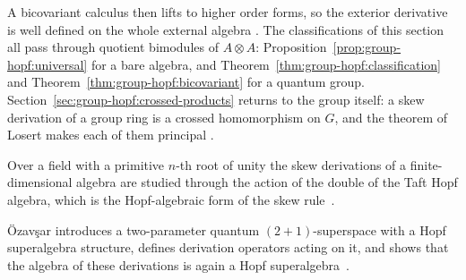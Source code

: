 A bicovariant calculus then lifts to higher order forms, so the exterior derivative
is well defined on the whole external algebra \cite[p.~125]{Woronowicz1989}. The
classifications of this section all pass through quotient bimodules of $A\otimes A$:
Proposition~\ref{prop:group-hopf:universal} for a bare algebra, and
Theorem~\ref{thm:group-hopf:classification} and Theorem~\ref{thm:group-hopf:bicovariant}
for a quantum group. Section~\ref{sec:group-hopf:crossed-products} returns to the
group itself: a skew derivation of a group ring is a crossed homomorphism on $G$,
and the theorem of Losert makes each of them principal \cite[p.~222]{Losert2008}.

Over a field with a primitive $n$-th root of unity the skew derivations of a finite-dimensional algebra are studied through the action of the double of the Taft Hopf algebra, which is the Hopf-algebraic form of the skew rule~\cite{WlSkewDerivationsOf2001}.

\"Ozav\c{s}ar introduces a two-parameter quantum $(2+1)$-superspace with a Hopf superalgebra structure, defines derivation operators acting on it, and shows that the algebra of these derivations is again a Hopf superalgebra~\cite{WlATwoParameterQuantum21Superspa2013}.
